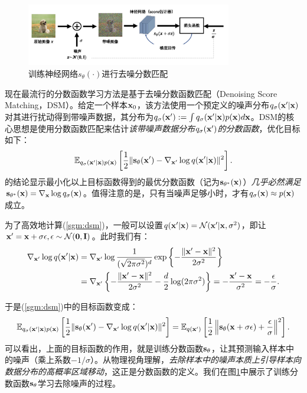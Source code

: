 \documentclass[11pt,a4paper,UTF8]{ctexart}
\begin{document}
\begin{figure}[tbp]
\centering
\includegraphics[width=0.8\textwidth]{img/SGM.jpg}
\caption{训练神经网络$s_\theta(\cdot)$进行去噪分数匹配}
\label{fig:sgm}
\end{figure}

现在最流行的分数函数学习方法是基于去噪分数函数匹配（Denoising Score Matching，DSM）\cite{vincent2011connection}。给定一个样本$\mathbf{x}_0$，该方法使用一个预定义的噪声分布$q_\sigma(\mathbf{x}^\prime|\mathbf{x})$对其进行扰动得到带噪声数据，其分布为$q_\sigma(\mathbf{x}^\prime):=\int q_\sigma(\mathbf{x}^\prime|\mathbf{x})p(\mathbf{x})d\mathbf{x}$。DSM的核心思想是使用分数函数匹配来估计\emph{该带噪声数据分布$q_\sigma(\mathbf{x}^\prime)$的分数函数}，优化目标如下：
\begin{equation}
\mathbb{E}_{q_\sigma(\mathbf{x}^\prime|\mathbf{x})p(\mathbf{x})} \left[\frac{1}{2}\| \mathbf{s}_{\theta}(\mathbf{x}^\prime) - \nabla_{\mathbf{x}^\prime}\log q(\mathbf{x}^\prime|\mathbf{x}) \|^2 \right].
\label{sgm:dsm}
\end{equation}
\cite{vincent2011connection}的结论显示最小化以上目标函数得到的最优分数函数（记为$\mathbf{s}_{\theta^*}(\mathbf{x})$）\emph{几乎必然满足}$\mathbf{s}_{\theta^*}(\mathbf{x})=\nabla_{\mathbf{x}}\log q_\sigma(\mathbf{x})$。值得注意的是，只有当噪声足够小时，才有$q_\sigma(\mathbf{x})\approx p(\mathbf{x})$成立。

为了高效地计算(\ref{sgm:dsm})，一般可以设置$q(\mathbf{x}^\prime|\mathbf{x})=\mathcal{N}(\mathbf{x}^\prime|\mathbf{x},\sigma^2)$，即让$\mathbf{x}^\prime=\mathbf{x}+\sigma\epsilon,\epsilon\sim\mathcal{N}(\mathbf{0},\mathbf{I})$。此时我们有：
\begin{align*}
    \nabla_{\mathbf{x}^\prime}\log q(\mathbf{x}^\prime|\mathbf{x}) &= \nabla_{\mathbf{x}^\prime}\log \frac{1}{(\sqrt{2\pi\sigma^2})^d}\exp\left\{-\frac{\|\mathbf{x}^\prime-\mathbf{x} \|^2}{2\sigma^2}\right\} \\
    &= \nabla_{\mathbf{x}^\prime} \left\{ -\frac{\|\mathbf{x}^\prime-\mathbf{x} \|^2}{2\sigma^2} -\frac{d}{2}\log (2\pi\sigma^2) \right\} = -\frac{\mathbf{x}^\prime-\mathbf{x}}{\sigma^2}=-\frac{\epsilon}{\sigma}.
\end{align*}

于是(\ref{sgm:dsm})中的目标函数变成：
\begin{equation}
\mathbb{E}_{q_\sigma(\mathbf{x}^\prime|\mathbf{x})p(\mathbf{x})} \left[\frac{1}{2}\| \mathbf{s}_{\theta}(\mathbf{x}^\prime) - \nabla_{\mathbf{x}^\prime}\log q(\mathbf{x}^\prime|\mathbf{x})  \|^2 \right] = \mathbb{E}_{q(\mathbf{x}^\prime)} \left[ \frac{1}{2}\left\| \mathbf{s}_\theta(\mathbf{x} +\sigma\epsilon)+\frac{\epsilon}{\sigma} \right\|^2\right].
\label{sgm:dsm_obj}
\end{equation}
可以看出，上面的目标函数的作用，就是训练分数函数$\mathbf{s}_\theta$，让其预测输入样本中的噪声（乘上系数$-1/\sigma$）。从物理视角理解，\emph{去除样本中的噪声本质上引导样本向数据分布的高概率区域移动}，这正是分数函数的定义。我们在图\ref{fig:sgm}中展示了训练分数函数$\mathbf{s}_\theta$学习去除噪声的过程。
\end{document}

